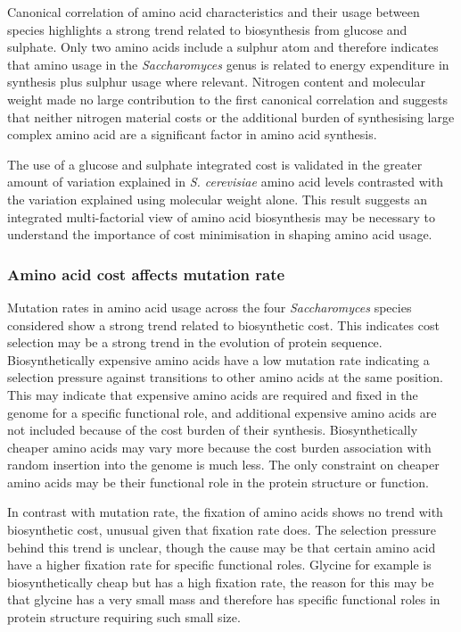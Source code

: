 Canonical correlation of amino acid characteristics and their usage between species highlights a strong trend related to biosynthesis from glucose and sulphate. Only two amino acids include a sulphur atom and therefore indicates that amino usage in the \emph{Saccharomyces} genus is related to energy expenditure in synthesis plus sulphur usage where relevant. Nitrogen content and molecular weight made no large contribution to the first canonical correlation and suggests that neither nitrogen material costs or the additional burden of synthesising large complex amino acid are a significant factor in amino acid synthesis.

The use of a glucose and sulphate integrated cost is validated in the greater amount of variation explained in \emph{S. cerevisiae} amino acid levels contrasted with the variation explained using molecular weight alone. This result suggests an integrated multi-factorial view of amino acid biosynthesis may be necessary to understand the importance of cost minimisation in shaping amino acid usage.

\subsubsection{Amino acid cost affects mutation rate}

Mutation rates in amino acid usage across the four \emph{Saccharomyces} species considered show a strong trend related to biosynthetic cost. This indicates cost selection may be a strong trend in the evolution of protein sequence. Biosynthetically expensive amino acids have a low mutation rate indicating a selection pressure against transitions to other amino acids at the same position. This may indicate that expensive amino acids are required and fixed in the genome for a specific functional role, and additional expensive amino acids are not included because of the cost burden of their synthesis. Biosynthetically cheaper amino acids may vary more because the cost burden association with random insertion into the genome is much less. The only constraint on cheaper amino acids may be their functional role in the protein structure or function.

In contrast with mutation rate, the fixation of amino acids shows no trend with biosynthetic cost, unusual given that fixation rate does. The selection pressure behind this trend is unclear, though the cause may be that certain amino acid have a higher fixation rate for specific functional roles. Glycine for example is biosynthetically cheap but has a high fixation rate, the reason for this may be that glycine has a very small mass and therefore has specific functional roles in protein structure requiring such small size.


